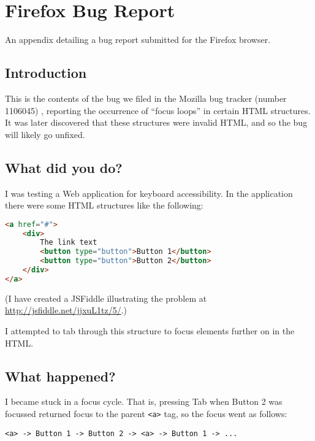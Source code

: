 \chapter{Firefox Bug Report} \label{App:Firefox Bug Report}

\begin{preamble}
	An appendix detailing a bug report submitted for the Firefox browser.
\end{preamble}

\section{Introduction}

This is the contents of the bug we filed in the Mozilla bug tracker (number 1106045) \citep{FirefoxFocusLoopBug}, reporting the occurrence of ``focus loops'' in certain HTML structures. It was later discovered that these structures were invalid HTML, and so the bug will likely go unfixed.

\section{What did you do?}\label{what-did-you-do}

I was testing a Web application for keyboard accessibility. In the
application there were some HTML structures like the following:

\begin{lstlisting}[language=html]
<a href="#">
    <div>
        The link text
        <button type="button">Button 1</button>
        <button type="button">Button 2</button>
    </div>
</a>
\end{lstlisting}

(I have created a JSFiddle illustrating the problem at
\url{http://jsfiddle.net/jjxuL1tz/5/}.)

I attempted to tab through this structure to focus elements further on
in the HTML.

\section{What happened?}\label{what-happened}

I became stuck in a focus cycle. That is, pressing Tab when Button 2 was
focussed returned focus to the parent
\texttt{\textless{}a\textgreater{}} tag, so the focus went as follows:

\begin{verbatim}
<a> -> Button 1 -> Button 2 -> <a> -> Button 1 -> ...
\end{verbatim}

